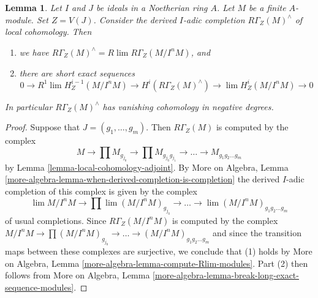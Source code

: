 \documentclass[10pt,a4paper]{amsart}
\theoremstyle{plain}
\newtheorem{lemma}[subsection]{Lemma}
\theoremstyle{definition}
\theoremstyle{remark}
\numberwithin{equation}{subsection}
\def\lim{\mathop{\mathrm{lim}}\nolimits}
\begin{document}
\begin{lemma}
\label{lemma-completion-local}
Let $I$ and $J$ be ideals in a Noetherian ring $A$. Let $M$ be a finite
$A$-module. Set $Z =V(J)$. Consider the derived $I$-adic completion
$R\Gamma_Z(M)^\wedge$ of local cohomology. Then
\begin{enumerate}
\item we have $R\Gamma_Z(M)^\wedge = R\lim R\Gamma_Z(M/I^nM)$, and
\item there are short exact sequences
$$
0 \to R^1\lim H^{i - 1}_Z(M/I^nM) \to H^i(R\Gamma_Z(M)^\wedge) \to
\lim H^i_Z(M/I^nM) \to 0
$$
\end{enumerate}
In particular $R\Gamma_Z(M)^\wedge$ has vanishing cohomology
in negative degrees.
\end{lemma}

\begin{proof}
Suppose that $J = (g_1, \ldots, g_m)$.
Then $R\Gamma_Z(M)$ is computed by the complex
$$
M \to \prod M_{g_{j_0}} \to \prod M_{g_{j_0}g_{j_1}} \to
\ldots \to M_{g_1g_2\ldots g_m}
$$
by Lemma \ref{lemma-local-cohomology-adjoint}.
By More on Algebra, Lemma
\ref{more-algebra-lemma-when-derived-completion-is-completion}
the derived $I$-adic completion of
this complex is given by the complex
$$
\lim M/I^nM \to \prod \lim (M/I^nM)_{g_{j_0}} \to
\ldots \to \lim (M/I^nM)_{g_1g_2\ldots g_m}
$$
of usual completions. Since $R\Gamma_Z(M/I^nM)$ is computed by
the complex $ M/I^nM \to \prod (M/I^nM)_{g_{j_0}} \to
\ldots \to (M/I^nM)_{g_1g_2\ldots g_m}$ and since the
transition maps between these complexes are surjective,
we conclude that (1) holds by
More on Algebra, Lemma \ref{more-algebra-lemma-compute-Rlim-modules}.
Part (2) then follows from More on Algebra, Lemma
\ref{more-algebra-lemma-break-long-exact-sequence-modules}.
\end{proof}
\end{document}
